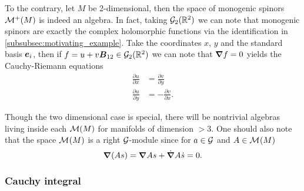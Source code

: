 To the contrary, let $M$ be 2-dimensional, then the space of monogenic spinors $\mathcal{M}^+(M)$ is indeed an algebra. In fact, taking $\mathcal{G}_2(\mathbb{R}^2)$ we can note that monogenic spinors are exactly the complex holomorphic functions via the identification in \cref{subsubsec:motivating_example}. Take the coordinates $x$, $y$ and the standard basis $\boldsymbol{e}_i$, then if $f=u+v\boldsymbol{B}_{12} \in \mathcal{G}_2(\mathbb{R}^2)$ we can note that $\boldsymbol{\nabla} f =0$ yields the Cauchy-Riemann equations
\begin{align}
\label{eq:cauchy_riemann_equations}
    \frac{\partial u}{\partial x} &= \frac{\partial v}{\partial y}\\
    \frac{\partial u}{\partial y} &= -\frac{\partial v}{\partial x}.
\end{align}

Though the two dimensional case is special, there will be nontrivial algebras living inside each $\mathcal{M}(M)$ for manifolds of dimension $>3$. One should also note that the space $\mathcal{M}^{}(M)$ is a right $\mathcal{G}$-module since for $a\in \mathcal{G}$ and $A\in \mathcal{M}^{}(M)$
\begin{equation}
\boldsymbol{\nabla}(As) = \boldsymbol{\nabla} A s + \dot{\boldsymbol{\nabla}}A \dot{s} = 0.
\end{equation}

\subsubsection{Cauchy integral}


